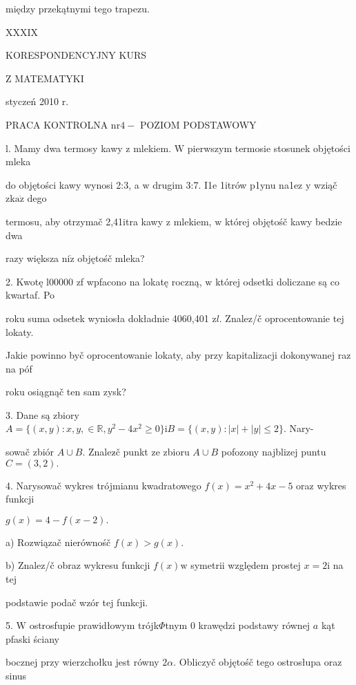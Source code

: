 \documentclass[a4paper,12pt]{article}
\begin{document}
między przekątnymi tego trapezu.





XXXIX

KORESPONDENCYJNY KURS

Z MATEMATYKI

styczeń 2010 r.

PRACA KONTROLNA $\mathrm{n}\mathrm{r} 4-$ POZIOM PODSTAWOWY

l. Mamy dwa termosy kawy $\mathrm{z}$ mlekiem. $\mathrm{W}$ pierwszym termosie stosunek objętości mleka

do objętości kawy wynosi 2:3, a $\mathrm{w}$ drugim 3:7. I1e 1itrów p1ynu na1ez $\mathrm{y}$ wziąč $\mathrm{z}\mathrm{k}\mathrm{a}\dot{\mathrm{z}}$ dego

termosu, aby otrzymač 2,41itra kawy $\mathrm{z}$ mlekiem, $\mathrm{w}$ której objętośč kawy bedzie dwa

razy większa $\mathrm{n}\mathrm{i}\dot{\mathrm{z}}$ objętośč mleka?

2. Kwotę l00000 zf wpfacono na lokatę roczną, $\mathrm{w}$ której odsetki doliczane są co kwartaf. Po

roku suma odsetek wyniosła dokładnie 4060,401 $\mathrm{z}l$. Znalez/č oprocentowanie tej lokaty.

Jakie powinno byč oprocentowanie lokaty, aby przy kapitalizacji dokonywanej raz na póf

roku osiągnąč ten sam zysk?

3. Dane są zbiory $A=\{(x,y):x,y,\in \mathbb{R},y^{2}-4x^{2}\geq 0\}\mathrm{i}B=\{(x,y):|x|+|y|\leq 2\}$. Nary-

sowač zbiór $A\cup B$. Znalez$\acute{}$č punkt ze zbioru $A\cup B$ pofozony najblizej puntu $C=(3,2).$

4. Narysowač wykres trójmianu kwadratowego $f(x) = x^{2}+4x-5$ oraz wykres funkcji

$g(x)=4-f(x-2).$

a) Rozwiązač nierównośč $f(x)>g(x).$

b) Znalez/č obraz wykresu funkcji $f(x) \mathrm{w}$ symetrii względem prostej $x=2 \mathrm{i}$ na tej

podstawie podač wzór tej funkcji.

5. $\mathrm{W}$ ostrosfupie prawidłowym trójk$\Phi$tnym $0$ krawędzi podstawy równej $a$ kąt pfaski ściany

bocznej przy wierzchołku jest równy $ 2\alpha$. Obliczyč objętośč tego ostrosłupa oraz sinus
\end{document}
